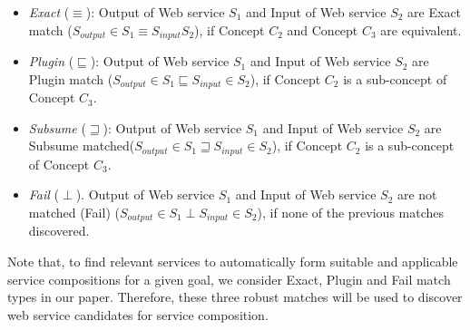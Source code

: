 \documentclass{llncs}
\begin{document}
\begin{itemize}
\item \textit{Exact} ($\equiv$): Output of Web service $S_{1}$ and Input of Web service $S_{2}$ are Exact match ($ S_{output} \in S_{1} \equiv S_{input}S_{2}$), if  Concept $C_{2}$ and Concept $C_{3}$ are equivalent.
\item \textit{Plugin} ($\sqsubseteq$): Output of Web service $S_{1}$ and Input of Web service $S_{2}$ are Plugin match ($S_{output} \in S_{1} \sqsubseteq S_{input} \in S_{2}$), if  Concept $C_{2}$ is a sub-concept of Concept $C_{3}$.
\item \textit{Subsume} ($\sqsupseteq$): Output of Web service $S_{1}$ and Input of Web service $S_{2}$ are Subsume matched($S_{output} \in S_{1} \sqsupseteq S_{input} \in S_{2}$), if  Concept $C_{2}$ is a sub-concept of  Concept $C_{3}$.
\item \textit{Fail} ($\perp$). Output of Web service $S_{1}$ and Input of Web service $S_{2}$ are not matched (Fail) ($S_{output} \in S_{1} \perp S_{input} \in S_{2}$), if none of the previous matches discovered.
\end{itemize}

Note that, to find relevant services to automatically form suitable and applicable service compositions for a given goal, we consider Exact, Plugin and Fail match types in our paper. Therefore, these three robust matches will be used to discover web service candidates for service composition. 
\end{document}
